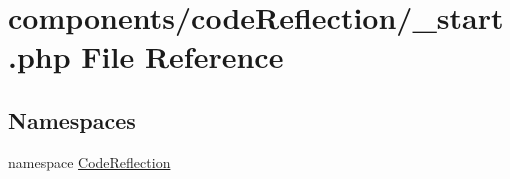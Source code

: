 \hypertarget{components_2code_reflection_2__start_8php}{
\section{components/codeReflection/\_\-start.php File Reference}
\label{components_2code_reflection_2__start_8php}
}
\subsection*{Namespaces}
\begin{CompactItemize}
\item 
namespace \hyperlink{namespace_code_reflection}{CodeReflection}
\end{CompactItemize}
